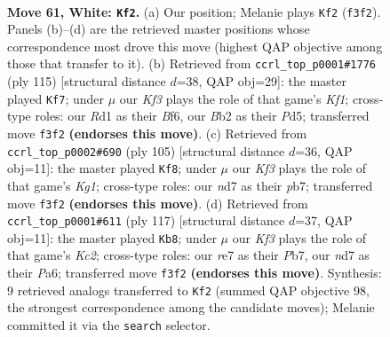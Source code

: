 \documentclass[11pt]{article}
\begin{document}
\clearpage

\begin{figure}[p]\centering
\begin{subfigure}{0.46\textwidth}\centering
\resizebox{\linewidth}{!}{%
\newchessgame
\chessboard[
  setfen={7k/3nr3/6P1/8/p1p5/P1P2K1p/1BP4P/3R4 w - - 11 61},
  showmover=false,
  pgfstyle=straightmove, color=movearrow, markmove={f3-f2}
]}
\caption{}
\end{subfigure}\hfill
\begin{subfigure}{0.46\textwidth}\centering
\resizebox{\linewidth}{!}{%
\newchessgame
\chessboard[
  setfen={5k2/8/5b2/3p2p1/1p1Pp1P1/1P2P2N/8/4K3 b - - 25 58},
  showmover=false,
  pgfstyle=straightmove, color=movearrow, markmove={f8-f7}
]}
\caption{}
\end{subfigure}
\\[4pt]
\begin{subfigure}{0.46\textwidth}\centering
\resizebox{\linewidth}{!}{%
\newchessgame
\chessboard[
  setfen={1r4k1/1PR5/3pbP2/p7/p3P1pK/8/1P6/8 b - - 5 53},
  showmover=false,
  pgfstyle=straightmove, color=movearrow, markmove={g8-f8}
]}
\caption{}
\end{subfigure}\hfill
\begin{subfigure}{0.46\textwidth}\centering
\resizebox{\linewidth}{!}{%
\newchessgame
\chessboard[
  setfen={8/1pk5/p3R3/P5p1/6P1/5p2/1Pb2P1K/8 b - - 6 59},
  showmover=false,
  pgfstyle=straightmove, color=movearrow, markmove={c7-b8}
]}
\caption{}
\end{subfigure}
\caption{\textbf{Move 61, White: \texttt{Kf2}.} (a) Our position; Melanie plays \texttt{Kf2} (\texttt{f3f2}). Panels (b)--(d) are the retrieved master positions whose correspondence most drove this move (highest QAP objective among those that transfer to it). (b) Retrieved from \texttt{ccrl\_top\_p0001\#1776} (ply 115) [structural distance $d$=38, QAP obj=29]: the master played \texttt{Kf7}; under $\mu$ our \emph{Kf3} plays the role of that game's \emph{Kf1}; cross-type roles: our \emph{R}d1 as their \emph{B}f6, our \emph{B}b2 as their \emph{P}d5; transferred move \texttt{f3f2} \textbf{(endorses this move)}. (c) Retrieved from \texttt{ccrl\_top\_p0002\#690} (ply 105) [structural distance $d$=36, QAP obj=11]: the master played \texttt{Kf8}; under $\mu$ our \emph{Kf3} plays the role of that game's \emph{Kg1}; cross-type roles: our \emph{n}d7 as their \emph{p}b7; transferred move \texttt{f3f2} \textbf{(endorses this move)}. (d) Retrieved from \texttt{ccrl\_top\_p0001\#611} (ply 117) [structural distance $d$=37, QAP obj=11]: the master played \texttt{Kb8}; under $\mu$ our \emph{Kf3} plays the role of that game's \emph{Kc2}; cross-type roles: our \emph{r}e7 as their \emph{P}b7, our \emph{n}d7 as their \emph{P}a6; transferred move \texttt{f3f2} \textbf{(endorses this move)}. Synthesis: 9 retrieved analogs transferred to \texttt{Kf2} (summed QAP objective 98, the strongest correspondence among the candidate moves); Melanie committed it via the \texttt{search} selector.}
\label{fig:thought-m120}
\end{figure}
\end{document}
